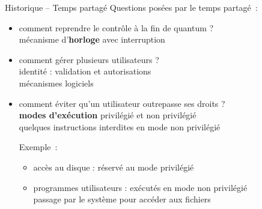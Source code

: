 \begin {frame} {Historique -- Temps partagé}
    Questions posées par le temps partagé~:

    \begin {itemize}
	\item comment reprendre le contrôle à la fin de quantum ?
	    \\
	    \implique mécanisme d'\textbf {horloge} avec interruption

	\item comment gérer plusieurs utilisateurs ?
	    \\
	    \implique identité : validation et autorisations \\
	    \implique mécanismes logiciels

	\item comment éviter qu'un utilisateur outrepasse ses droits ?
	    \\
	    \implique \textbf {modes d'exécution} privilégié et non
		privilégié \\
	    \implique quelques instructions interdites en mode non
		privilégié

	    \vspace* {1mm}

	    Exemple~:
	    \begin {itemize}
		\item accès au disque : réservé au mode
		    privilégié
		\item programmes utilisateurs : exécutés
		    en mode non privilégié
		    \\
		    \implique passage par le système pour
		    accéder aux fichiers
	    \end {itemize}

    \end {itemize}

\end {frame}

